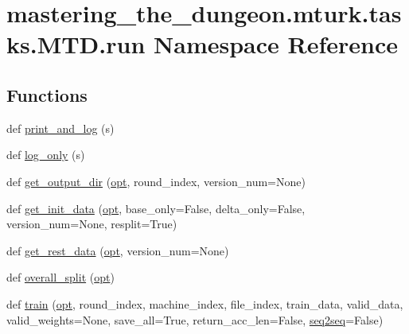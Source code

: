 \hypertarget{namespacemastering__the__dungeon_1_1mturk_1_1tasks_1_1MTD_1_1run}{}\section{mastering\+\_\+the\+\_\+dungeon.\+mturk.\+tasks.\+M\+T\+D.\+run Namespace Reference}
\label{namespacemastering__the__dungeon_1_1mturk_1_1tasks_1_1MTD_1_1run}
\subsection*{Functions}
\begin{DoxyCompactItemize}
\item 
def \hyperlink{namespacemastering__the__dungeon_1_1mturk_1_1tasks_1_1MTD_1_1run_ae9470c6f4c17df22c645c66d61556c8f}{print\+\_\+and\+\_\+log} (s)
\item 
def \hyperlink{namespacemastering__the__dungeon_1_1mturk_1_1tasks_1_1MTD_1_1run_a1925a7306fdbea58efedb85cb2ab2145}{log\+\_\+only} (s)
\item 
def \hyperlink{namespacemastering__the__dungeon_1_1mturk_1_1tasks_1_1MTD_1_1run_a62781f44b43636ee721e462700efeeac}{get\+\_\+output\+\_\+dir} (\hyperlink{namespacemastering__the__dungeon_1_1mturk_1_1tasks_1_1MTD_1_1run_a637b31bdf145203e9426ad66a6513f2a}{opt}, round\+\_\+index, version\+\_\+num=None)
\item 
def \hyperlink{namespacemastering__the__dungeon_1_1mturk_1_1tasks_1_1MTD_1_1run_af11196d8dedb6354bfadb6fe86276a04}{get\+\_\+init\+\_\+data} (\hyperlink{namespacemastering__the__dungeon_1_1mturk_1_1tasks_1_1MTD_1_1run_a637b31bdf145203e9426ad66a6513f2a}{opt}, base\+\_\+only=False, delta\+\_\+only=False, version\+\_\+num=None, resplit=True)
\item 
def \hyperlink{namespacemastering__the__dungeon_1_1mturk_1_1tasks_1_1MTD_1_1run_a7d8855ab1a7622d4b811085a733b8483}{get\+\_\+rest\+\_\+data} (\hyperlink{namespacemastering__the__dungeon_1_1mturk_1_1tasks_1_1MTD_1_1run_a637b31bdf145203e9426ad66a6513f2a}{opt}, version\+\_\+num=None)
\item 
def \hyperlink{namespacemastering__the__dungeon_1_1mturk_1_1tasks_1_1MTD_1_1run_aa7818a9d2c6c401d2c6aeb75dec54397}{overall\+\_\+split} (\hyperlink{namespacemastering__the__dungeon_1_1mturk_1_1tasks_1_1MTD_1_1run_a637b31bdf145203e9426ad66a6513f2a}{opt})
\item 
def \hyperlink{namespacemastering__the__dungeon_1_1mturk_1_1tasks_1_1MTD_1_1run_ae3eef3ab364f34b11c71cf1b936afdf1}{train} (\hyperlink{namespacemastering__the__dungeon_1_1mturk_1_1tasks_1_1MTD_1_1run_a637b31bdf145203e9426ad66a6513f2a}{opt}, round\+\_\+index, machine\+\_\+index, file\+\_\+index, train\+\_\+data, valid\+\_\+data, valid\+\_\+weights=None, save\+\_\+all=True, return\+\_\+acc\+\_\+len=False, \hyperlink{namespacemastering__the__dungeon_1_1mturk_1_1tasks_1_1MTD_1_1run_a75b170de6a584daf5d0d550aa9c1ad60}{seq2seq}=False)

\end{DoxyCompactItemize}
